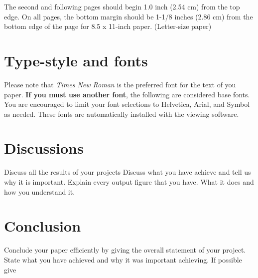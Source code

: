 \documentclass[10pt,sigconf, review]{article}
\begin{document}
The second and following pages should begin 1.0 inch (2.54 cm) from the top
edge. On all pages, the bottom margin should be 1-1/8 inches (2.86 cm) from the
bottom edge of the page for 8.5 x 11-inch paper. (Letter-size paper)

\section{Type-style and fonts}
\label{sec:type-style}

Please note that {\em Times New Roman} is the preferred font for the text of
you paper. \textbf{If you must use another font}, the following are considered
base fonts.  You are encouraged to limit your font selections to Helvetica,
Arial, and Symbol as needed. These fonts are automatically installed with the
viewing software. 



 


\section{Discussions}
Discuss all the results of your projects Discuss what you have achieve and tell
us why it is important. Explain every output figure that you have. What it does
and how you understand it.

\section{Conclusion}
Conclude your paper efficiently by giving the overall statement of your
project. State what you have achieved and why it was important achieving. If
possible give 









\end{document}
